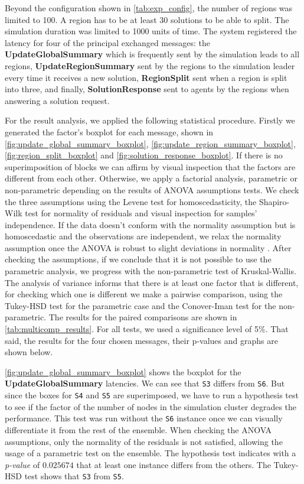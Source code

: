 \documentclass[preprint,12pt]{elsarticle}
\begin{document}
Beyond the configuration shown in \autoref{tab:exp_config}, the number of regions was limited to 100. A region has to be at least 30 solutions to be able to split. The simulation duration was limited to 1000 units of time. The system registered the latency for four of the principal exchanged messages: the \textbf{UpdateGlobalSummary} which is frequently sent by the simulation leads to all regions, \textbf{UpdateRegionSummary} sent by the regions to the simulation leader every time it receives a new solution, \textbf{RegionSplit} sent when a region is split into three, and finally, \textbf{SolutionResponse} sent to agents by the regions when answering a solution request. 

For the result analysis, we applied the following statistical procedure. Firstly we generated the factor's boxplot for each message, shown in \ref{fig:update_global_summary_boxplot}, \ref{fig:update_region_summary_boxplot}, \ref{fig:region_split_boxplot} and \ref{fig:solution_response_boxplot}. If there is no superimposition of blocks we can affirm by  visual inspection that the factors are different from each other. Otherwise, we apply a factorial analysis, parametric or non-parametric depending on the results of ANOVA assumptions tests. We check the three assumptions using the Levene test for homoscedasticity, the Shapiro-Wilk test for normality of residuals and visual inspection for samples' independence. If the data doesn't conform with the normality assumption but is homoscedastic and the observations are independent, we relax the normality assumption once the ANOVA is robust to slight deviations in normality \cite{blanca2017}. After checking the assumptions, if we conclude that it is not possible to use the parametric analysis, we progress with the non-parametric test of Kruskal-Wallis. The analysis of variance informs that there is at least one factor that is different, for checking which one is different we make a pairwise comparison, using the Tukey-HSD test for the parametric case and the Conover-Iman test for the non-parametric. The results for the paired comparisons are shown in \autoref{tab:multicomp_results}. For all tests, we used a significance level of 5\%. That said, the results for the four chosen messages, their p-values and graphs are shown below. 

\autoref{fig:update_global_summary_boxplot} shows the boxplot for the \textbf{UpdateGlobalSummary} latencies. We can see that \texttt{S3} differs from \texttt{S6}. But since the boxes for \texttt{S4} and \texttt{S5} are superimposed, we have to run a hypothesis test to see if the factor of the number of nodes in the simulation cluster degrades the performance. This test was run without the \texttt{S6} instance once we can visually differentiate it from the rest of the ensemble. When checking the ANOVA assumptions, only the normality of the residuals is not satisfied, allowing the usage of a parametric test on the ensemble. The hypothesis test indicates with a \textit{p-value} of $0.025674$ that at least one instance differs from the others. The Tukey-HSD test shows that \texttt{S3} from \texttt{S5}.
\end{document}
